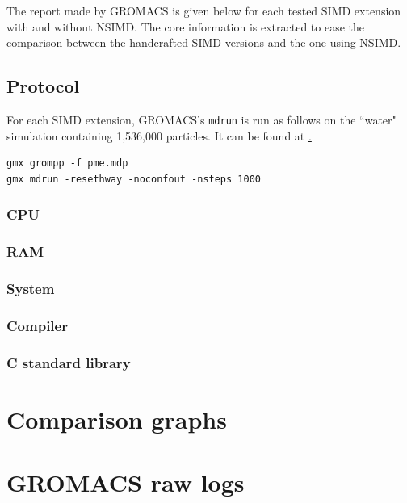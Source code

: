 \documentclass[a4paper,11pt]{article}
\newcommand{\gromacs}{GROMACS}
\newcommand{\nsimd}{NSIMD}
\begin{document}
The report made by \gromacs{} is given below for each tested SIMD extension
with and without \nsimd{}. The core information is extracted to ease the
comparison between the handcrafted SIMD versions and the one using \nsimd{}.

\subsection{Protocol}

For each SIMD extension, \gromacs{}'s \texttt{mdrun} is run as follows on
the ``water" simulation containing 1,536,000 particles. It can be found
at \href{https://ftp.gromacs.org/pub/benchmarks/water_GMX50_bare.tar.gz}.

\begin{lstlisting}
gmx grompp -f pme.mdp
gmx mdrun -resethway -noconfout -nsteps 1000
\end{lstlisting}

\subsubsection{CPU}


\subsubsection{RAM}


\subsubsection{System}


\subsubsection{Compiler}


\subsubsection{C standard library}

 
\section{Comparison graphs}


\section{GROMACS raw logs}
\end{document}

